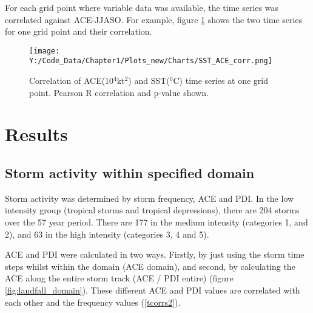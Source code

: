 

For each grid point where variable data was available, the time series was correlated against ACE-JJASO. For example, figure \ref{fig:corr_graph} shows the two time series for one grid point and their correlation. %


\begin{figure}
	\centering
	\noindent\texttt{[image: Y:/Code\_Data/Chapter1/Plots\_new/Charts/SST\_ACE\_corr.png]}
	\caption{Correlation of ACE(10$^4$kt$^2$) and SST($^0$C) time series at one grid point. Pearson R correlation and p-value shown.}\label{fig:corr_graph}
\end{figure}




\section{Results}

\subsection{Storm activity within specified domain}

Storm activity was determined by storm frequency, ACE and PDI. In the low intensity group (tropical storms and tropical depressions), there are 204 storms over the 57 year period. There are 177 in the medium intensity (categories 1, and 2), and 63 in the high intensity (categories 3, 4 and 5).

ACE and PDI were calculated in two ways. Firstly, by just using the storm time steps whilst within the domain (ACE domain), and second, by calculating the ACE along the entire storm track (ACE / PDI entire) (figure \ref{fig:landfall_domain}). These different ACE and PDI values are correlated with each other and the frequency values (\ref{tcorrs2}).




